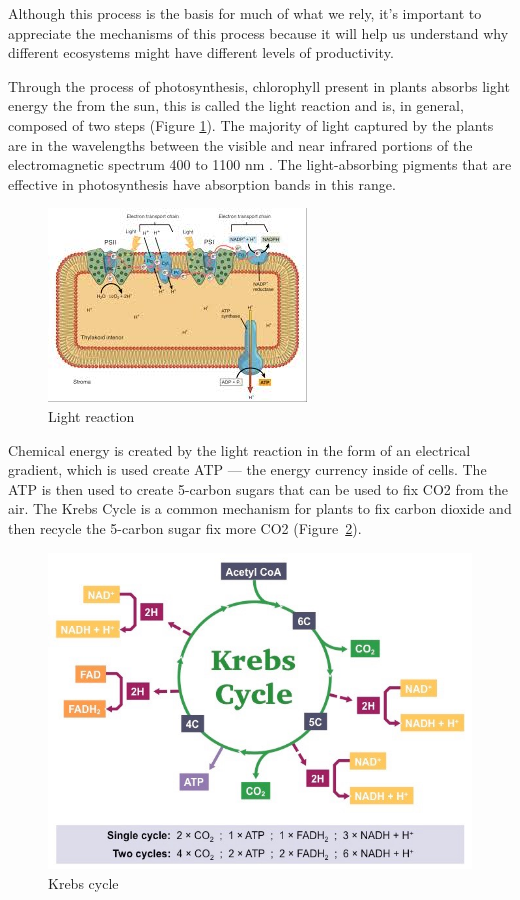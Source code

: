 Although this process is the basis for much of what we rely, it's important to appreciate the mechanisms of this process because it will help us understand why different ecosystems might have different levels of productivity. 

Through the process of \gls{photosynthesis}, chlorophyll present in plants absorbs light energy the from the sun, this is called the light reaction and is, in general, composed of two steps (Figure \ref{fig:light_rxn}). The majority of light captured by the plants are in the wavelengths between the visible and near infrared portions of the electromagnetic spectrum 400 to 1100 nm \citep{stenberg2010visible}. The light-absorbing pigments that are effective in photosynthesis have absorption bands in this range.

\begin{figure}[htb]
	\centering
		\includegraphics{graphics/light_rxn.jpg}
	\caption{Light reaction}
	\label{fig:light_rxn}
\end{figure}

Chemical energy is created by the light reaction in the form of an electrical gradient, which is used create ATP --- the energy currency inside of cells. The ATP is then used to create 5-carbon sugars that can be used to fix CO2 from the air. The Krebs Cycle is a common mechanism for plants to fix carbon dioxide and then recycle the 5-carbon sugar fix more CO2 (Figure~\ref{fig:krebs-cycle_med}). 

\begin{figure}[htb]
	\centering
		\includegraphics{graphics/krebs-cycle_med.jpeg}
	\caption{Krebs cycle}
	\label{fig:krebs-cycle_med}
\end{figure}


